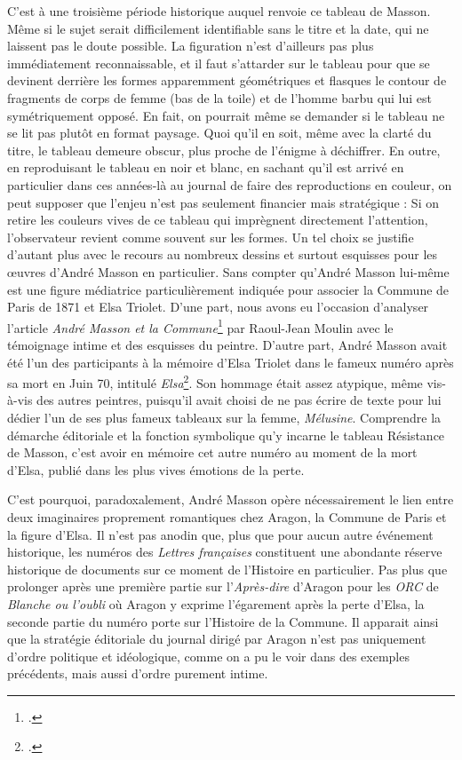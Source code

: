 C’est à une troisième période historique auquel renvoie ce tableau de Masson. Même si le sujet serait difficilement identifiable sans le titre et la date, qui ne laissent pas le doute possible. La figuration n’est d’ailleurs pas plus immédiatement reconnaissable, et il faut s’attarder sur le tableau pour que se devinent derrière les formes apparemment géométriques et flasques le contour de fragments de corps de femme (bas de la toile) et de l’homme barbu qui lui est symétriquement opposé. En fait, on pourrait même se demander si le tableau ne se lit pas plutôt en format paysage. Quoi qu’il en soit, même avec la clarté du titre, le tableau demeure obscur, plus proche de l’énigme à déchiffrer. En outre, en reproduisant le tableau en noir et blanc, en sachant qu’il est arrivé en particulier dans ces années-là au journal de faire des reproductions en couleur, on peut supposer que l’enjeu n’est pas seulement financier mais stratégique : Si on retire les couleurs vives de ce tableau qui imprègnent directement l’attention, l’observateur revient comme souvent sur les formes. Un tel choix se justifie d’autant plus avec le recours au nombreux dessins et surtout esquisses pour les \oe{}uvres d’André Masson en particulier. Sans compter qu’André Masson lui-même est une figure médiatrice particulièrement indiquée pour associer la Commune de Paris de 1871 et Elsa Triolet. D’une part, nous avons eu l’occasion d’analyser l’article \emph{André Masson et la Commune}\footcite{commune} par  Raoul-Jean Moulin avec le témoignage intime et des esquisses du peintre. D’autre part, André Masson avait été l’un des participants à la mémoire d’Elsa Triolet dans le fameux numéro après sa mort en Juin 70, intitulé \emph{Elsa}\footcite{specialelsa}. Son hommage était assez atypique, même vis-à-vis des autres peintres, puisqu’il avait choisi de ne pas écrire de texte pour lui dédier l’un de ses plus fameux  tableaux sur la femme, \emph{Mélusine}. Comprendre la démarche éditoriale et la fonction symbolique qu’y incarne le tableau Résistance de Masson, c’est avoir en mémoire cet autre numéro au moment de la mort d’Elsa, publié dans les plus vives émotions de la perte.


C’est pourquoi, paradoxalement, André Masson opère nécessairement le lien entre deux imaginaires proprement romantiques chez Aragon, la Commune de Paris et la figure d’Elsa. Il n’est pas anodin que, plus que pour aucun autre événement historique, les numéros des \emph{Lettres françaises} constituent une abondante réserve historique de documents sur ce moment de l’Histoire en particulier. Pas plus que prolonger après une première partie sur l’\emph{Après-dire} d’Aragon pour les \emph{ORC} de \emph{Blanche ou l’oubli} où Aragon y exprime l’égarement après la perte d’Elsa, la seconde partie du numéro porte sur l’Histoire de la Commune. Il apparait ainsi que la stratégie éditoriale du journal dirigé par Aragon n’est pas uniquement d’ordre politique et idéologique, comme on a pu le voir dans des exemples précédents, mais aussi d’ordre purement intime. 


